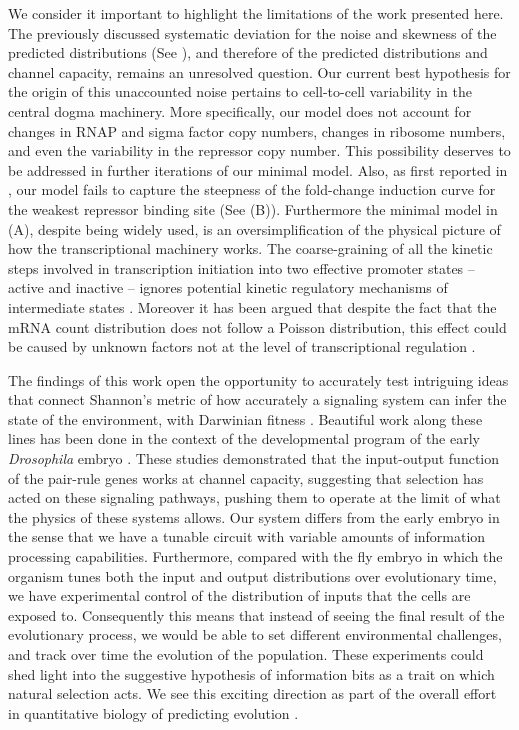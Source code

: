 We consider it important to highlight the limitations of the work presented
here. The previously discussed systematic deviation for the noise and skewness
of the predicted distributions (See ), and therefore of
the predicted distributions and channel capacity, remains an unresolved
question. Our current best hypothesis for the origin of this unaccounted noise
pertains to cell-to-cell variability in the central dogma machinery. More
specifically, our model does not account for changes in RNAP and sigma factor
copy numbers, changes in ribosome numbers, and even the variability in the
repressor copy number. This possibility deserves to be addressed in further
iterations of our minimal model. Also, as first reported in
\cite{Razo-Mejia2018}, our model fails to capture the steepness of the
fold-change induction curve for the weakest repressor binding site (See
(B)). Furthermore the minimal model in
(A), despite being widely used, is an
oversimplification of the physical picture of how the transcriptional machinery
works. The coarse-graining of all the kinetic steps involved in transcription
initiation into two effective promoter states -- active and inactive -- ignores
potential kinetic regulatory mechanisms of intermediate states
\cite{Scholes2017}. Moreover it has been argued that despite the fact that the
mRNA count distribution does not follow a Poisson distribution, this effect
could be caused by unknown factors not at the level of transcriptional
regulation \cite{Choubey2018}.

The findings of this work open the opportunity to accurately test intriguing
ideas that connect Shannon's metric of how accurately a signaling system can
infer the state of the environment, with Darwinian fitness \cite{Taylor2007}.
Beautiful work along these lines has been done in the context of the
developmental program of the early {\it Drosophila} embryo \cite{Tkacik2008,
Petkova2019}. These studies demonstrated that the input-output function of the
pair-rule genes works at channel capacity, suggesting that selection has acted
on these signaling pathways, pushing them to operate at the limit of what the
physics of these systems allows. Our system differs from the early embryo in
the sense that we have a tunable circuit with variable amounts of information
processing capabilities. Furthermore, compared with the fly embryo in which the
organism tunes both the input and output distributions over evolutionary time,
we have experimental control of the distribution of inputs that the cells are
exposed to. Consequently this means that instead of seeing the final result of
the evolutionary process, we would be able to set different environmental
challenges, and track over time the evolution of the population. These
experiments could shed light into the suggestive hypothesis of information bits
as a trait on which natural selection acts. We see this exciting direction as
part of the overall effort in quantitative biology of predicting evolution
\cite{Lassig2017}.